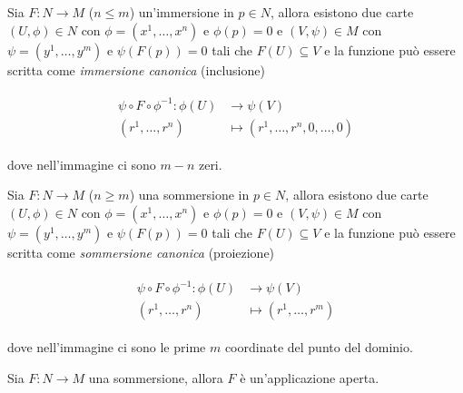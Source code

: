 \begin{theorem}\label{loc-imm}
	Sia $ F : N \to M $ ($ n \leqslant m $) un'immersione in $ p \in N $, allora esistono due carte $ (U,\phi) \in N $ con $ \phi = (x^{1},\dots,x^{n}) $ e $ \phi(p)=0 $ e $ (V,\psi) \in M $ con $ \psi = (y^{1},\dots,y^{m}) $ e $ \psi(F(p))=0 $ tali che $ F(U) \subseteq V $ e la funzione può essere scritta come \textit{immersione canonica} (inclusione)
	
	\begin{align}
		\begin{split}
			\psi \circ F \circ \phi^{-1} : \phi(U) &\to \psi(V)\\
			(r^{1},\dots,r^{n}) &\mapsto (r^{1},\dots,r^{n},0,\dots,0)
		\end{split}
	\end{align}

	dove nell'immagine ci sono $ m-n $ zeri.
\end{theorem}

\begin{theorem}\label{loc-sub}
	Sia $ F : N \to M $ ($ n \geqslant m $) una sommersione in $ p \in N $, allora esistono due carte $ (U,\phi) \in N $ con $ \phi = (x^{1},\dots,x^{n}) $ e $ \phi(p)=0 $ e $ (V,\psi) \in M $ con $ \psi = (y^{1},\dots,y^{m}) $ e $ \psi(F(p))=0 $ tali che $ F(U) \subseteq V $ e la funzione può essere scritta come \textit{sommersione canonica} (proiezione)
	
	\begin{align}
		\begin{split}
			\psi \circ F \circ \phi^{-1} : \phi(U) &\to \psi(V)\\
			(r^{1},\dots,r^{n}) &\mapsto (r^{1},\dots,r^{m})
		\end{split}
	\end{align}
	
	dove nell'immagine ci sono le prime $ m $ coordinate del punto del dominio.
\end{theorem}

\begin{corollary}[1]\label{th-somm-loc-cor}
	Sia $ F : N \to M $ una sommersione, allora $ F $ è un'applicazione aperta.
\end{corollary}

